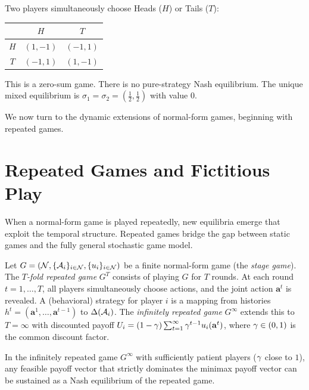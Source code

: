 \documentclass[11pt,a4paper]{article}
\begin{document}
\begin{example}
\label{ex:matching-pennies}
Two players simultaneously choose Heads ($H$) or Tails ($T$):
\begin{center}
\begin{tabular}{c|cc}
  & $H$ & $T$ \\ \hline
  $H$ & $(1,-1)$ & $(-1,1)$ \\
  $T$ & $(-1,1)$ & $(1,-1)$
\end{tabular}
\end{center}
This is a zero-sum game.  There is no pure-strategy Nash equilibrium.
The unique mixed equilibrium is $\sigma_1 = \sigma_2 =
(\tfrac{1}{2}, \tfrac{1}{2})$ with value $0$.
\end{example}

We now turn to the dynamic extensions of normal-form games, beginning
with repeated games.

\section{Repeated Games and Fictitious Play}
\label{sec:repeated-games}

When a normal-form game is played repeatedly, new equilibria emerge
that exploit the temporal structure.  Repeated games bridge the gap
between static games and the fully general stochastic game model.

\begin{definition}
\label{def:repeated-game}
Let $G = (\mathcal{N}, \{\mathcal{A}_i\}_{i \in \mathcal{N}},
\{u_i\}_{i \in \mathcal{N}})$ be a finite normal-form game (the
\emph{stage game}).  The \emph{$T$-fold repeated game} $G^T$ consists
of playing $G$ for $T$ rounds.  At each round $t = 1, \ldots, T$,
all players simultaneously choose actions, and the joint action
$\mathbf{a}^t$ is revealed.  A (behavioral) strategy for player $i$
is a mapping from histories $h^t = (\mathbf{a}^1, \ldots,
\mathbf{a}^{t-1})$ to $\Delta(\mathcal{A}_i)$.  The
\emph{infinitely repeated game} $G^\infty$ extends this to
$T = \infty$ with discounted payoff
$U_i = (1 - \gamma) \sum_{t=1}^{\infty} \gamma^{t-1}
u_i(\mathbf{a}^t)$, where $\gamma \in (0,1)$ is the common
discount factor.
\end{definition}

\begin{theorem}
\label{thm:folk}
In the infinitely repeated game $G^\infty$ with sufficiently patient
players ($\gamma$ close to $1$), any feasible payoff vector that
strictly dominates the minimax payoff vector can be sustained as a
Nash equilibrium of the repeated game.
\end{theorem}
\end{document}
